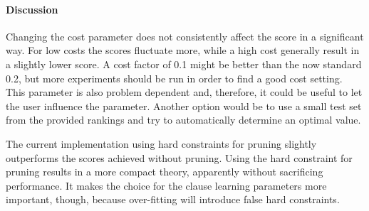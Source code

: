 \paragraph{Discussion}
Changing the cost parameter does not consistently affect the score in a significant way.
For low costs the scores fluctuate more, while a high cost generally result in a slightly lower score.
A cost factor of 0.1 might be better than the now standard 0.2, but more experiments should be run in order to find a good cost setting.
This parameter is also problem dependent and, therefore, it could be useful to let the user influence the parameter.
Another option would be to use a small test set from the provided rankings and try to automatically determine an optimal value.

The current implementation using hard constraints for pruning slightly outperforms the scores achieved without pruning.
Using the hard constraint for pruning results in a more compact theory, apparently without sacrificing performance.
It makes the choice for the clause learning parameters more important, though, because over-fitting will introduce false hard constraints.
